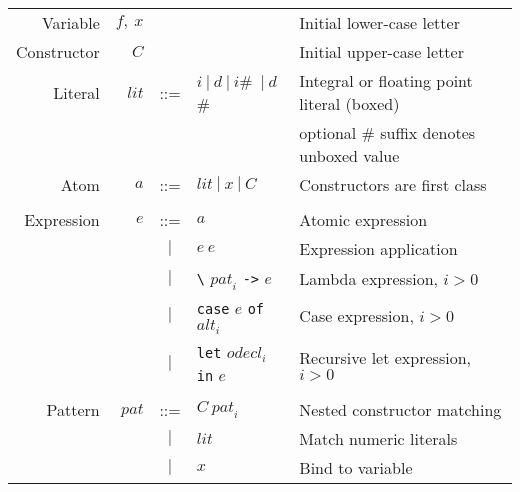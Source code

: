 \documentclass{llncs}
\begin{document}


\newcommand{\hash}{{\scriptsize\#}}

\begin{table}
\centering
\begin{tabular}{r r c l l}
Variable         & $f,\ x$             &     &
& Initial lower-case letter \\

Constructor        & $C$                 &     & 
& Initial upper-case letter \\

Literal            & $\mathit{lit}$      & ::= & $i\ |\ d\ 
                                                 |\ i$\hash\ $|\ d$\hash
& Integral or floating point literal (boxed) \\

                   &                     &     & 
& optional \# suffix denotes unboxed value \\

Atom               & $a$                 & ::= & $\mathit{lit}\ |\ x\ |\ C$
& Constructors are first class \\ 
\\


Expression         & $e$                 & ::= & $a$
& Atomic expression \\

                   &                     & $|$ & $e\ e$
& Expression application \\

                   &                     & $|$ & \texttt{\textbackslash} $\mathit{pat}_i$ 
                                               \texttt{->} $e$
& Lambda expression, $i > 0$ \\

                   &                     & $|$ & \texttt{case} $e$ \texttt{of} $\mathit{alt}_i$
& Case expression, $i > 0$\\

                   &                     & $|$ & \texttt{let} $\mathit{odecl}_i$ \texttt{in} $e$
& Recursive let expression, $i > 0$ \\

\\


Pattern            & $\mathit{pat}$      & ::= & $C\ \mathit{pat}_i$
& Nested constructor matching \\
                   &                     & $|$ & $\mathit{lit}$
& Match numeric literals \\
                   &                     & $|$ & $x$
& Bind to variable \\


\end{tabular}
\end{table}
\end{document}
